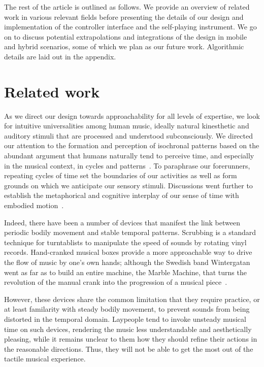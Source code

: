 \documentclass{nime-alternate} %
\begin{document}
The rest of the article is outlined as follows. We provide an overview of related work in various relevant fields before presenting the details of our design and implementation of the controller interface and the self-playing instrument. We go on to discuss potential extrapolations and integrations of the design in mobile and hybrid scenarios, some of which we plan as our future work. Algorithmic details are laid out in the appendix.

\section{Related work}

As we direct our design towards approachability for all levels of expertise, we look for intuitive universalities among human music, ideally natural kinesthetic and auditory stimuli that are processed and understood subconsciously. We directed our attention to the formation and perception of isochronal patterns based on the abundant argument that humans naturally tend to perceive time, and especially in the musical context, in cycles and patterns~\cite{Brower:Cog, Neisser_1976, Ravignani2016}. To paraphrase our forerunners, repeating cycles of time set the boundaries of our activities as well as form grounds on which we anticipate our sensory stimuli. Discussions went further to establish the metaphorical and cognitive interplay of our sense of time with embodied motion~\cite{Johnson_Larson_2003, Johnson_2008}.

Indeed, there have been a number of devices that manifest the link between periodic bodily movement and stable temporal patterns. Scrubbing is a standard technique for turntablists to manipulate the speed of sounds by rotating vinyl records. Hand-cranked musical boxes provide a more approachable way to drive the flow of music by one's own hands; although the Swedish band Wintergatan went as far as to build an entire machine, the Marble Machine, that turns the revolution of the manual crank into the progression of a musical piece~\cite{Rundle_Woollaston-Webber_2017}.

However, these devices share the common limitation that they require practice, or at least familarity with steady bodily movement, to prevent sounds from being distorted in the temporal domain. Laypeople tend to invoke unsteady musical time on such devices, rendering the music less understandable and aesthetically pleasing, while it remains unclear to them how they should refine their actions in the reasonable directions. Thus, they will not be able to get the most out of the tactile musical experience.
\end{document}
